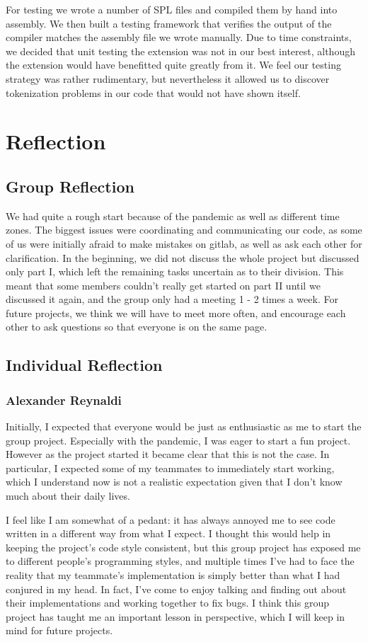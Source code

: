\documentclass[11pt]{article}
\begin{document}
For testing we wrote a number of SPL files and compiled them by hand into assembly. We then built a testing framework that verifies the output of the compiler matches the assembly file we wrote manually. Due to time constraints, we decided that unit testing the extension was not in our best interest, although the extension would have benefitted quite greatly from it. We feel our testing strategy was rather rudimentary, but nevertheless it allowed us to discover tokenization problems in our code that would not have shown itself.

\section{Reflection}
\subsection{Group Reflection}
We had quite a rough start because of the pandemic as well as different time zones. The biggest issues were coordinating and communicating our code, as some of us were initially afraid to make mistakes on gitlab, as well as ask each other for clarification. In the beginning, we did not discuss the whole project but discussed only part I, which left the remaining tasks uncertain as to their division. This meant that some members couldn’t really get started on part II until we discussed it again, and the group only had a meeting 1 - 2 times a week. For future projects, we think we will have to meet more often, and encourage each other to ask questions so that everyone is on the same page.

\subsection{Individual Reflection}
\subsubsection{Alexander Reynaldi}
Initially, I expected that everyone would be just as enthusiastic as me to start the group project. Especially with the pandemic, I was eager to start a fun project. However as the project started it became clear that this is not the case. In particular, I expected some of my teammates to immediately start working, which I understand now is not a realistic expectation given that I don't know much about their daily lives.

I feel like I am somewhat of a pedant: it has always annoyed me to see code written in a different way from what I expect. I thought this would help in keeping the project's code style consistent, but this group project has exposed me to different people's programming styles, and multiple times I've had to face the reality that my teammate's implementation is simply better than what I had conjured in my head. In fact, I've come to enjoy talking and finding out about their implementations and working together to fix bugs. I think this group project has taught me an important lesson in perspective, which I will keep in mind for future projects.
\end{document}
